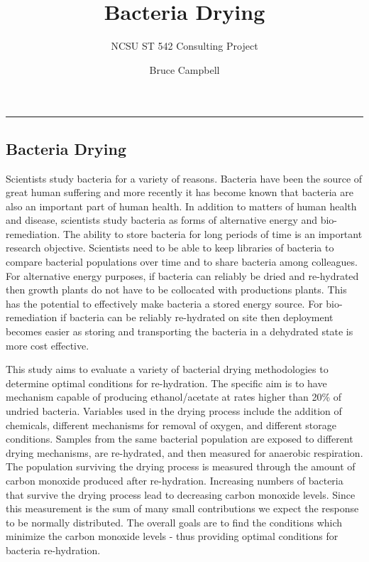 \documentclass[12pt,]{article}
\title{Bacteria Drying}
\subtitle{NCSU ST 542 Consulting Project}
\author{Bruce Campbell}
\date{}
\begin{document}
\maketitle

\begin{center}\rule{0.5\linewidth}{\linethickness}\end{center}

\subsection{Bacteria Drying}\label{bacteria-drying}

Scientists study bacteria for a variety of reasons. Bacteria have been
the source of great human suffering and more recently it has become
known that bacteria are also an important part of human health. In
addition to matters of human health and disease, scientists study
bacteria as forms of alternative energy and bio-remediation. The ability
to store bacteria for long periods of time is an important research
objective. Scientists need to be able to keep libraries of bacteria to
compare bacterial populations over time and to share bacteria among
colleagues. For alternative energy purposes, if bacteria can reliably be
dried and re-hydrated then growth plants do not have to be collocated
with productions plants. This has the potential to effectively make
bacteria a stored energy source. For bio-remediation if bacteria can be
reliably re-hydrated on site then deployment becomes easier as storing
and transporting the bacteria in a dehydrated state is more cost
effective.

This study aims to evaluate a variety of bacterial drying methodologies
to determine optimal conditions for re-hydration. The specific aim is to
have mechanism capable of producing ethanol/acetate at rates higher than
20\% of undried bacteria. Variables used in the drying process include
the addition of chemicals, different mechanisms for removal of oxygen,
and different storage conditions. Samples from the same bacterial
population are exposed to different drying mechanisms, are re-hydrated,
and then measured for anaerobic respiration. The population surviving
the drying process is measured through the amount of carbon monoxide
produced after re-hydration. Increasing numbers of bacteria that survive
the drying process lead to decreasing carbon monoxide levels. Since this
measurement is the sum of many small contributions we expect the
response to be normally distributed. The overall goals are to find the
conditions which minimize the carbon monoxide levels - thus providing
optimal conditions for bacteria re-hydration.
\end{document}
